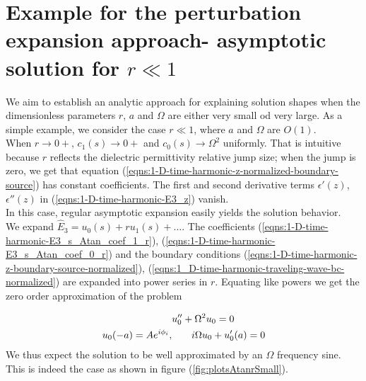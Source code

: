 \documentclass[12pt,twoside]{report}
\begin{document}
\section{Example for the perturbation expansion approach- asymptotic solution for $r \ll 1$  }
\label{sec:perExpansionSmall_r} 
We aim to establish an analytic approach for explaining solution shapes when the dimensionless parameters $r$, $a$ and $\Omega$ are either very small od very large. As a simple example, we consider the case $r \ll 1$, where $a$ and $\Omega$ are $O(1)$.\\
When $r \rightarrow 0+$, $c_1(s) \rightarrow 0+$ and $c_0(s)\rightarrow \Omega^2$ uniformly. That is intuitive because $r$ reflects the dielectric permittivity relative jump size; when the jump is zero, we get that equation (\ref{eqns:1-D-time-harmonic-z-normalized-boundary-source}) has constant coefficients. The first and second derivative terms $\epsilon'(z)$, $\epsilon''(z)$ in (\ref{eqns:1-D-time-harmonic-E3_z}) vanish.\\
In this case, regular asymptotic expansion easily yields the solution behavior. \\
We expand $\hat{E}_3 = u_0(s)+r u_1(s)+ \ldots$. The coefficients (\ref{eqns:1-D-time-harmonic-E3_s_Atan_coef_1_r}), (\ref{eqns:1-D-time-harmonic-E3_s_Atan_coef_0_r}) and the boundary conditions (\ref{eqns:1-D-time-harmonic-z-boundary-source-normalized}), (\ref{eqns:1_D-time-harmonic-traveling-wave-bc-normalized}) are expanded into power series in $r$. Equating like powers we get the zero order approximation of the problem



\begin{align}
\label{eqns:1-D-time-harmonic-E3_s_Atan_coefs-zero-order-per}
&u_0''+\Omega^2 u_0 = 0 \notag\\
u_0(-a) = A e^{i \phi_i}, &\qquad i \Omega u_0 + u_0'(a) = 0
\end{align} 
We thus expect the solution to be well approximated by an $\Omega$ frequency sine. This is indeed the case as shown in figure (\ref{fig:plotsAtanrSmall}).
\end{document}
